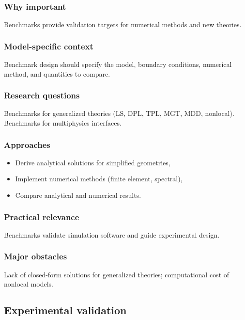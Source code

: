 \subsubsection{Why important}

Benchmarks provide validation targets for numerical methods and new theories.

\subsubsection{Model-specific context}

Benchmark design should specify the model, boundary conditions, numerical method, and quantities to compare.

\subsubsection{Research questions}

Benchmarks for generalized theories (LS, DPL, TPL, MGT, MDD, nonlocal). Benchmarks for multiphysics interfaces.

\subsubsection{Approaches}

\begin{itemize}
\item Derive analytical solutions for simplified geometries,
\item Implement numerical methods (finite element, spectral),
\item Compare analytical and numerical results.
\end{itemize}

\subsubsection{Practical relevance}

Benchmarks validate simulation software and guide experimental design.

\subsubsection{Major obstacles}

Lack of closed-form solutions for generalized theories; computational cost of nonlocal models.

\subsection{Experimental validation}
\label{sec:15.4}

